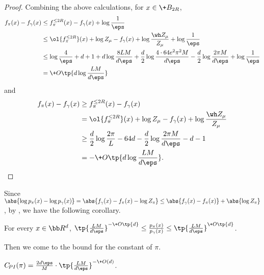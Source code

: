 \begin{proof}
    Combining the above calculations, for $x\in \+B_{2R}$,
    \begin{align*}
        f_\pi(x) - f_\gamma(x) &\leq f^{\le 2R}_{\pi}(x) - f_\gamma(x) + \log \frac{1}{\eps}\\
        &\leq \ol{f^{\le 2R}_{\pi}}(x)+\log Z_{\mu} - f_\gamma(x) + \log\frac{\wh Z_\mu}{Z_\mu} + \log \frac{1}{\eps}\\
        &\leq \log \frac{4}{\eps} + d+ 1 + d\log \frac{8 L M}{d\eps} + \frac{d}{2}\log \frac{4\cdot 64 e^2\pi^2 M}{d\eps} - \frac{d}{2}\log\frac{2\pi M}{d\eps} + \log \frac{1}{\eps}\\
        &= \+O\tp{d\log \frac{LM}{d\eps}}
    \end{align*}
    and 
    \begin{align*}
        f_\pi(x) - f_\gamma(x) &\geq f^{\le 2R}_{\pi}(x) - f_\gamma(x) \\
        &= \ol{f^{\le 2R}_{\pi}}(x)+\log Z_{\mu} - f_\gamma(x) + \log\frac{\wh Z_\mu}{Z_\mu} \\
        &\geq \frac{d}{2}\log\frac{2\pi}{L} - 64d - \frac{d}{2}\log\frac{2\pi M}{d\eps} - d - 1\\
        &= - \+O\tp{d\log \frac{LM}{d\eps}}.
    \end{align*}
\end{proof}

Since $\abs{\log p_\pi(x) - \log p_\gamma(x)} = \abs{f_\gamma(x)-f_\pi(x)-\log Z_\pi} \le \abs{f_\gamma(x)-f_\pi(x)}+\abs{\log Z_\pi}$, by , we have the following corollary.

\begin{corollary}\label{cor:pclose}
    For every $x\in\bb R^d$, $\tp{\frac{LM}{d\eps}}^{-\+O\tp{d}}\le \frac{p_\pi(x)}{p_\gamma(x)} \le \tp{\frac{LM}{d\eps}}^{\+O\tp{d}}$.
\end{corollary}

Then we come to the bound for the \Poincare constant of $\pi$. 

\begin{lemma}\label{lem:pi-PI}
    $C_{\!{PI}}(\pi) = \frac{2d\eps}{M}\cdot \tp{\frac{LM}{d\eps}}^{-\+O(d)}$.
\end{lemma}

